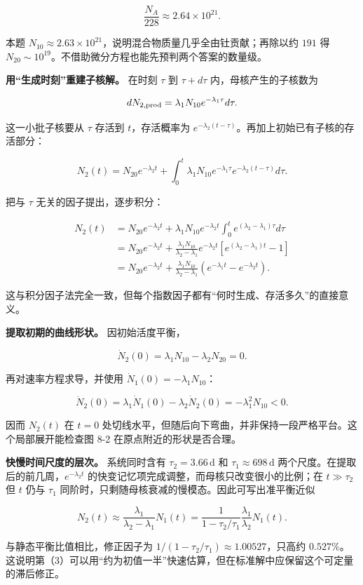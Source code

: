 \documentclass[12pt,a4paper,UTF8]{ctexart}
\begin{document}
\[
\frac{N_A}{228}\approx2.64\times10^{21}.
\]

本题
\(N_{10}\approx2.63\times10^{21}\)，说明混合物质量几乎全由钍贡献；再除以约
\(191\) 得
\(N_{20}\sim10^{19}\)。不借助微分方程也能先预判两个答案的数量级。

\textbf{用``生成时刻''重建子核解。} 在时刻 \(\tau\) 到 \(\tau+d\tau\)
内，母核产生的子核数为

\[
dN_{2,\rm prod}=\lambda_1N_{10}e^{-\lambda_1\tau}d\tau.
\]

这一小批子核要从 \(\tau\) 存活到 \(t\)，存活概率为
\(e^{-\lambda_2(t-\tau)}\)。再加上初始已有子核的存活部分：

\[
N_2(t)=N_{20}e^{-\lambda_2t}
+\int_0^t\lambda_1N_{10}e^{-\lambda_1\tau}
e^{-\lambda_2(t-\tau)}d\tau.
\]

把与 \(\tau\) 无关的因子提出，逐步积分：

\[
\begin{aligned}
N_2(t)
&=N_{20}e^{-\lambda_2t}
+\lambda_1N_{10}e^{-\lambda_2t}
\int_0^t e^{(\lambda_2-\lambda_1)\tau}d\tau\\
&=N_{20}e^{-\lambda_2t}
+\frac{\lambda_1N_{10}}{\lambda_2-\lambda_1}
e^{-\lambda_2t}
\left[e^{(\lambda_2-\lambda_1)t}-1\right]\\
&=N_{20}e^{-\lambda_2t}
+\frac{\lambda_1N_{10}}{\lambda_2-\lambda_1}
\left(e^{-\lambda_1t}-e^{-\lambda_2t}\right).
\end{aligned}
\]

这与积分因子法完全一致，但每个指数因子都有``何时生成、存活多久''的直接意义。

\textbf{提取初期的曲线形状。} 因初始活度平衡，

\[
\dot N_2(0)=\lambda_1N_{10}-\lambda_2N_{20}=0.
\]

再对速率方程求导，并使用 \(\dot N_1(0)=-\lambda_1N_{10}\)：

\[
\ddot N_2(0)
=\lambda_1\dot N_1(0)-\lambda_2\dot N_2(0)
=-\lambda_1^2N_{10}<0.
\]

因而 \(N_2(t)\) 在 \(t=0\)
处切线水平，但随后向下弯曲，并非保持一段严格平台。这个局部展开能检查图
8-2 在原点附近的形状是否合理。

\textbf{快慢时间尺度的层次。} 系统同时含有 \(\tau_2=3.66\,\mathrm d\) 和
\(\tau_1\approx698\,\mathrm d\)
两个尺度。在提取后的前几周，\(e^{-\lambda_2t}\)
的快变记忆项完成调整，而母核只改变很小的比例；在 \(t\gg \tau_2\) 但
\(t\) 仍与 \(\tau_1\)
同阶时，只剩随母核衰减的慢模态。因此可写出准平衡近似

\[
N_2(t)
\approx\frac{\lambda_1}{\lambda_2-\lambda_1}N_1(t)
=\frac{1}{1-\tau_2/\tau_1}
\frac{\lambda_1}{\lambda_2}N_1(t).
\]

与静态平衡比值相比，修正因子为
\(1/(1-\tau_2/\tau_1)\approx1.00527\)，只高约
\(0.527\%\)。这说明第（3）可以用``约为初值一半''快速估算，但在标准解中应保留这个可定量的滞后修正。
\end{document}

